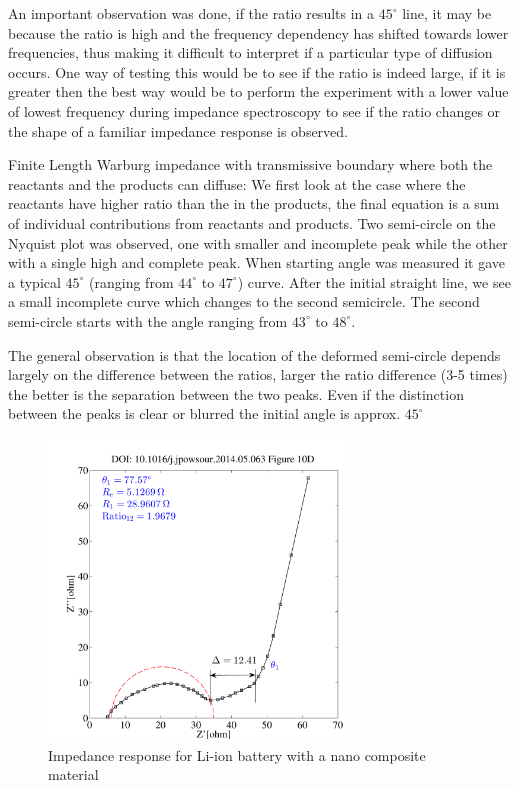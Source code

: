 \documentclass[12pt]{book}
\begin{document}
An important observation was done, if the ratio results in a $45^\circ$  line, it may be because the ratio is high and the frequency dependency has shifted towards lower frequencies, thus making it difficult to interpret if a particular type of diffusion occurs. One way of testing this would be to see if the ratio is indeed large, if it is greater then the best way would be to perform the experiment with a lower value of lowest frequency during impedance spectroscopy to see if the ratio changes or the shape of a familiar impedance response is observed.  

Finite Length Warburg impedance with transmissive boundary where both the reactants and the products can diffuse: We first look at the case where the reactants have higher ratio than the in the products, the final equation is a sum of individual contributions from reactants and products. Two semi-circle on the Nyquist plot was observed, one with smaller and incomplete peak while the other with a single high and complete peak. When starting angle was measured it gave a typical $45^\circ$ (ranging from $44^\circ$ to $47^\circ$) curve. After the initial straight line, we see a small incomplete curve which changes to the second semicircle. The second semi-circle starts with the angle ranging from $43^\circ$ to $48^\circ$. 

The general observation is that the location of the deformed semi-circle depends largely on the difference between the ratios, larger the ratio difference (3-5 times) the better is the separation between the two peaks. Even if the distinction between the peaks is clear or blurred the initial angle is approx. $45^\circ$  
\begin{figure}[h!]
	\centering
	\includegraphics[width=0.7\textwidth]{figures/Das2014_1}
	\caption{Impedance response for Li-ion battery with a nano composite material}
\end{figure}
\end{document}
